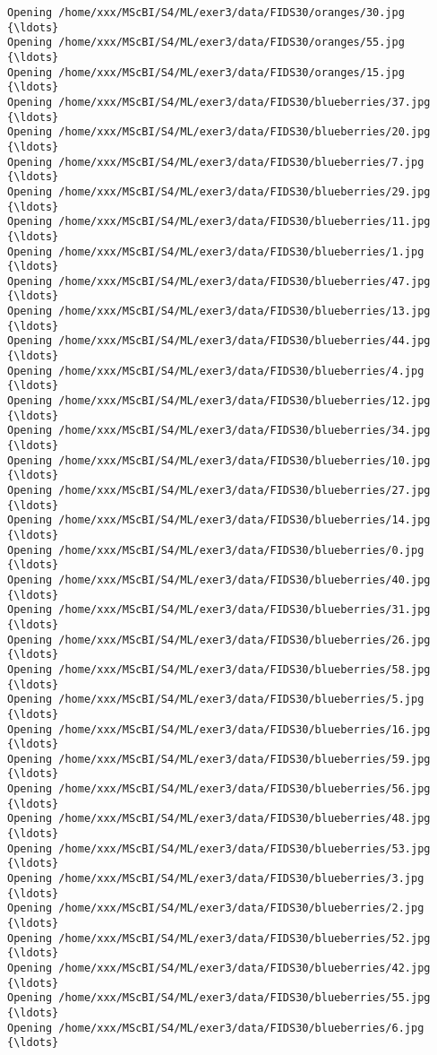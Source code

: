 \documentclass[11pt]{article}
\begin{document}
\begin{Verbatim}[commandchars=\\\{\}]
Opening /home/xxx/MScBI/S4/ML/exer3/data/FIDS30/oranges/30.jpg  {\ldots}
Opening /home/xxx/MScBI/S4/ML/exer3/data/FIDS30/oranges/55.jpg  {\ldots}
Opening /home/xxx/MScBI/S4/ML/exer3/data/FIDS30/oranges/15.jpg  {\ldots}
Opening /home/xxx/MScBI/S4/ML/exer3/data/FIDS30/blueberries/37.jpg  {\ldots}
Opening /home/xxx/MScBI/S4/ML/exer3/data/FIDS30/blueberries/20.jpg  {\ldots}
Opening /home/xxx/MScBI/S4/ML/exer3/data/FIDS30/blueberries/7.jpg  {\ldots}
Opening /home/xxx/MScBI/S4/ML/exer3/data/FIDS30/blueberries/29.jpg  {\ldots}
Opening /home/xxx/MScBI/S4/ML/exer3/data/FIDS30/blueberries/11.jpg  {\ldots}
Opening /home/xxx/MScBI/S4/ML/exer3/data/FIDS30/blueberries/1.jpg  {\ldots}
Opening /home/xxx/MScBI/S4/ML/exer3/data/FIDS30/blueberries/47.jpg  {\ldots}
Opening /home/xxx/MScBI/S4/ML/exer3/data/FIDS30/blueberries/13.jpg  {\ldots}
Opening /home/xxx/MScBI/S4/ML/exer3/data/FIDS30/blueberries/44.jpg  {\ldots}
Opening /home/xxx/MScBI/S4/ML/exer3/data/FIDS30/blueberries/4.jpg  {\ldots}
Opening /home/xxx/MScBI/S4/ML/exer3/data/FIDS30/blueberries/12.jpg  {\ldots}
Opening /home/xxx/MScBI/S4/ML/exer3/data/FIDS30/blueberries/34.jpg  {\ldots}
Opening /home/xxx/MScBI/S4/ML/exer3/data/FIDS30/blueberries/10.jpg  {\ldots}
Opening /home/xxx/MScBI/S4/ML/exer3/data/FIDS30/blueberries/27.jpg  {\ldots}
Opening /home/xxx/MScBI/S4/ML/exer3/data/FIDS30/blueberries/14.jpg  {\ldots}
Opening /home/xxx/MScBI/S4/ML/exer3/data/FIDS30/blueberries/0.jpg  {\ldots}
Opening /home/xxx/MScBI/S4/ML/exer3/data/FIDS30/blueberries/40.jpg  {\ldots}
Opening /home/xxx/MScBI/S4/ML/exer3/data/FIDS30/blueberries/31.jpg  {\ldots}
Opening /home/xxx/MScBI/S4/ML/exer3/data/FIDS30/blueberries/26.jpg  {\ldots}
Opening /home/xxx/MScBI/S4/ML/exer3/data/FIDS30/blueberries/58.jpg  {\ldots}
Opening /home/xxx/MScBI/S4/ML/exer3/data/FIDS30/blueberries/5.jpg  {\ldots}
Opening /home/xxx/MScBI/S4/ML/exer3/data/FIDS30/blueberries/16.jpg  {\ldots}
Opening /home/xxx/MScBI/S4/ML/exer3/data/FIDS30/blueberries/59.jpg  {\ldots}
Opening /home/xxx/MScBI/S4/ML/exer3/data/FIDS30/blueberries/56.jpg  {\ldots}
Opening /home/xxx/MScBI/S4/ML/exer3/data/FIDS30/blueberries/48.jpg  {\ldots}
Opening /home/xxx/MScBI/S4/ML/exer3/data/FIDS30/blueberries/53.jpg  {\ldots}
Opening /home/xxx/MScBI/S4/ML/exer3/data/FIDS30/blueberries/3.jpg  {\ldots}
Opening /home/xxx/MScBI/S4/ML/exer3/data/FIDS30/blueberries/2.jpg  {\ldots}
Opening /home/xxx/MScBI/S4/ML/exer3/data/FIDS30/blueberries/52.jpg  {\ldots}
Opening /home/xxx/MScBI/S4/ML/exer3/data/FIDS30/blueberries/42.jpg  {\ldots}
Opening /home/xxx/MScBI/S4/ML/exer3/data/FIDS30/blueberries/55.jpg  {\ldots}
Opening /home/xxx/MScBI/S4/ML/exer3/data/FIDS30/blueberries/6.jpg  {\ldots}

\end{Verbatim}
\end{document}
